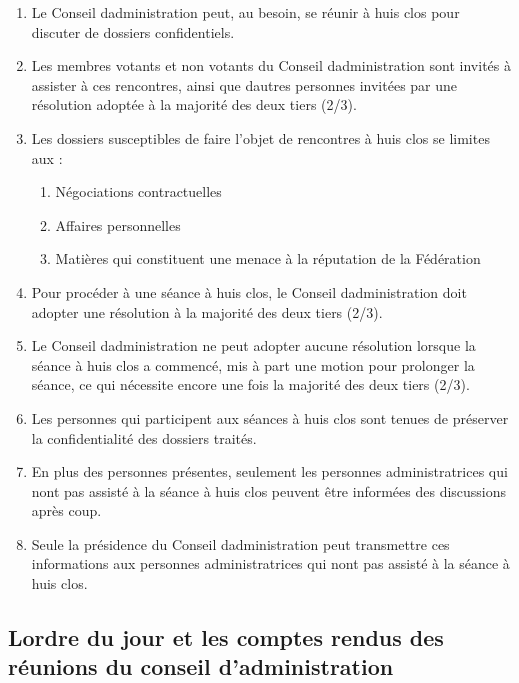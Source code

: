 \begin{enumerate}
 \item
  Le Conseil d\textquotesingle administration peut, au besoin, se réunir à huis clos pour discuter de dossiers confidentiels.
 \item
  Les membres votants et non votants du Conseil d\textquotesingle administration sont invités à assister à ces rencontres, ainsi que d\textquotesingle autres personnes invitées par une résolution adoptée à la majorité des deux tiers (2/3).
 \item
  Les dossiers susceptibles de faire l'objet de rencontres à huis clos se limites aux :

  \begin{enumerate}
   \item
    Négociations contractuelles
   \item
    Affaires personnelles
   \item
    Matières qui constituent une menace à la réputation de la Fédération
  \end{enumerate}
 \item
  Pour procéder à une séance à huis clos, le Conseil d\textquotesingle administration doit adopter une résolution à la majorité des deux tiers (2/3).
 \item
  Le Conseil d\textquotesingle administration ne peut adopter aucune résolution lorsque la séance à huis clos a commencé, mis à part une motion pour prolonger la séance, ce qui nécessite encore une fois la majorité des deux tiers (2/3).
 \item
  Les personnes qui participent aux séances à huis clos sont tenues de préserver la confidentialité des dossiers traités.
 \item
  En plus des personnes présentes, seulement les personnes administratrices qui n\textquotesingle ont pas assisté à la séance à huis clos peuvent être informées des discussions après coup.
 \item
  Seule la présidence du Conseil d\textquotesingle administration peut transmettre ces informations aux personnes administratrices qui n\textquotesingle ont pas assisté à la séance à huis clos.
\end{enumerate}

\subsection{L\textquotesingle ordre du jour et les comptes rendus des réunions du conseil d’administration}
\label{lordre-du-jour-et-les-comptes-rendus-des-reunions-du-conseil}

